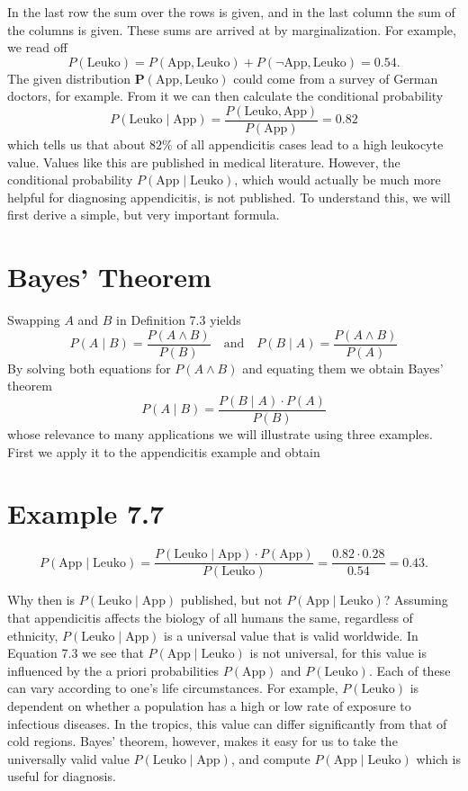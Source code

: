 \documentclass[10pt]{book}
\begin{document}
In the last row the sum over the rows is given, and in the last column the sum of the columns is given. These sums are arrived at by marginalization. For example, we read off
$$
P(\text{Leuko})=P(\text{App}, \text{Leuko})+P(\neg \text{App}, \text{Leuko})=0.54 .
$$
The given distribution $\boldsymbol{P}(\text{App}, \text{Leuko})$ could come from a survey of German doctors, for example. From it we can then calculate the conditional probability
$$
P(\text{Leuko} \mid \text{App})=\frac{P(\text{Leuko}, \text{App})}{P(\text{App})}=0.82
$$
which tells us that about $82 \%$ of all appendicitis cases lead to a high leukocyte value. Values like this are published in medical literature. However, the conditional probability $P(\text{App} \mid \text{Leuko})$, which would actually be much more helpful for diagnosing appendicitis, is not published. To understand this, we will first derive a simple, but very important formula.

\section{Bayes' Theorem}
Swapping $A$ and $B$ in Definition 7.3 yields
$$
P(A \mid B)=\frac{P(A \wedge B)}{P(B)} \quad \text{and} \quad P(B \mid A)=\frac{P(A \wedge B)}{P(A)}
$$
By solving both equations for $P(A \wedge B)$ and equating them we obtain Bayes’ theorem
\begin{equation*}
P(A \mid B)=\frac{P(B \mid A) \cdot P(A)}{P(B)} \tag{7.2}
\end{equation*}
whose relevance to many applications we will illustrate using three examples. First we apply it to the appendicitis example and obtain

\section{Example 7.7}
\begin{equation*}
P(\text{App} \mid \text{Leuko})=\frac{P(\text{Leuko} \mid \text{App}) \cdot P(\text{App})}{P(\text{Leuko})}=\frac{0.82 \cdot 0.28}{0.54}=0.43 . \tag{7.3}
\end{equation*}

Why then is $P(\text{Leuko} \mid \text{App})$ published, but not $P(\text{App} \mid \text{Leuko})$? Assuming that appendicitis affects the biology of all humans the same, regardless of ethnicity, $P(\text{Leuko} \mid \text{App})$ is a universal value that is valid worldwide. In Equation 7.3 we see that $P(\text{App} \mid \text{Leuko})$ is not universal, for this value is influenced by the a priori probabilities $P(\text{App})$ and $P(\text{Leuko})$. Each of these can vary according to one's life circumstances. For example, $P(\text{Leuko})$ is dependent on whether a population has a high or low rate of exposure to infectious diseases. In the tropics, this value can differ significantly from that of cold regions. Bayes' theorem, however, makes it easy for us to take the universally valid value $P(\text{Leuko} \mid \text{App})$, and compute $P(\text{App} \mid \text{Leuko})$ which is useful for diagnosis.
\end{document}
